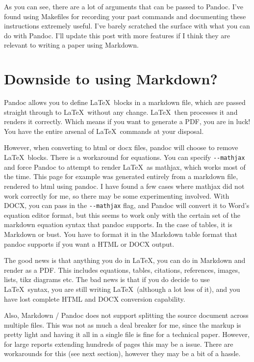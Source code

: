 \documentclass[journal,10pt,final]{IEEEtran}
\begin{document}
As you can see, there are a lot of arguments that can be passed to
Pandoc. I've found using Makefiles for recording your past commands and
documenting these instructions extremely useful. I've barely scratched
the surface with what you can do with Pandoc. I'll update this post with
more features if I think they are relevant to writing a paper using
Markdown.

\section{Downside to using Markdown?}\label{downside-to-using-markdown}

Pandoc allows you to define \LaTeX~blocks in a markdown file, which are
passed straight through to \LaTeX~without any change. \LaTeX~then
processes it and renders it correctly. Which means if you want to
generate a PDF, you are in luck! You have the entire arsenal of
\LaTeX~commands at your disposal.

However, when converting to html or docx files, pandoc will choose to
remove \LaTeX~blocks. There is a workaround for equations. You can
specify \texttt{-\/-mathjax} and force Pandoc to attempt to render
\LaTeX~as mathjax, which works most of the time. This page for example
was generated entirely from a markdown file, rendered to html using
pandoc. I have found a few cases where mathjax did not work correctly
for me, so there may be some experimenting involved. With DOCX, you can
pass in the \texttt{-\/-mathjax} flag, and Pandoc will convert it to
Word's equation editor format, but this seems to work only with the
certain set of the markdown equation syntax that pandoc supports. In the
case of tables, it is Markdown or bust. You have to format it in the
Markdown table format that pandoc supports if you want a HTML or DOCX
output.

The good news is that anything you do in \LaTeX, you can do in Markdown
and render as a PDF. This includes equations, tables, citations,
references, images, lists, tikz diagrams etc. The bad news is that if
you do decide to use \LaTeX~syntax, you are still writing
\LaTeX~(although a lot less of it), and you have lost complete HTML and
DOCX conversion capability.

Also, Markdown / Pandoc does not support splitting the source document
across multiple files. This was not as much a deal breaker for me, since
the markup is pretty light and having it all in a single file is fine
for a technical paper. However, for large reports extending hundreds of
pages this may be a issue. There are workarounds for this (see next
section), however they may be a bit of a hassle.
\end{document}
